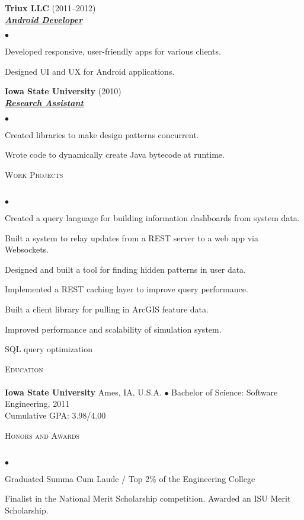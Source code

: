 \documentclass{article}
\newcommand{\lineunder} {
	\vspace*{-8pt} \\ \hspace*{-18pt} \hrulefill \\
}
\newcommand{\header}[1] {
	{\hspace*{-15pt}\vspace*{6pt} \textsc{#1}} \vspace*{-6pt} \lineunder
}
\newcommand{\employer}[3] {
	{ \textbf{#1} (#2)\\ \underline{\textbf{\emph{#3}}}\\  }
}
\newenvironment{achievements} {
	\begin{list}{$\bullet$}
		{\topsep 0pt \itemsep -2pt}
	}{
		\vspace*{4pt}\end{list}
	}
\newcommand{\school}[4] {
	\textbf{#1} #2 $\bullet$ #3\\
	\hspace*{15pt}#4 \\
	\vspace*{5pt}
}
\begin{document}
	\employer{Triux LLC}{2011--2012}{Android Developer}
		\begin{achievements}
			\item{Developed responsive, user-friendly apps for various clients.}
			\item{Designed UI and UX for Android applications.}
		\end{achievements}

	\employer{Iowa State University}{2010}{Research Assistant}
		\begin{achievements}
			\item{Created libraries to make design patterns concurrent.}
			\item{Wrote code to dynamically create Java bytecode at runtime.}
		\end{achievements}


\header{Work Projects}

	\begin{achievements}
      \item{Created a query language for building information dashboards from system data.}
      \item{Built a system to relay updates from a REST server to a web app via Websockets.}
      \item{Designed and built a tool for finding hidden patterns in user data.}
      \item{Implemented a REST caching layer to improve query performance.}
      \item{Built a client library for pulling in ArcGIS feature data.}
      \item{Improved performance and scalability of simulation system.}
      \item{SQL query optimization}
   \end{achievements}

\header{Education}

	\school{Iowa State University}{Ames, IA, U.S.A.}{Bachelor of Science: Software Engineering, 2011}
	{Cumulative GPA: 3.98/4.00}

\header{Honors and Awards}

	\begin{achievements}
		\item{Graduated Summa Cum Laude / Top 2\% of the Engineering College}
		\item{Finalist in the National Merit Scholarship competition. Awarded an ISU Merit Scholarship.}
	\end{achievements}
\end{document}
